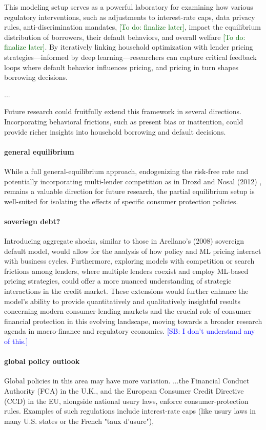 \documentclass[acmsmall]{acmart}
\newcommand{\todo}[1]{\textcolor{DarkGreen}{[To do: #1]}}
\newcommand{\spb}[1]{\textcolor{blue}{[SB: #1]}}
\begin{document}
This modeling setup serves as a powerful laboratory for examining how various regulatory interventions, such as adjustments to interest-rate caps, data privacy rules, anti-discrimination mandates, \todo{finalize later}, impact the equilibrium distribution of borrowers, their default behaviors, and overall welfare \todo{finalize later}. By iteratively linking household optimization with lender pricing strategies—informed by deep learning—researchers can capture critical feedback loops where default behavior influences pricing, and pricing in turn shapes borrowing decisions.


...

Future research could fruitfully extend this framework in several directions. Incorporating behavioral frictions, such as present bias or inattention, could provide richer insights into household borrowing and default decisions. 

\paragraph{general equilibrium}
While a full general-equilibrium approach, endogenizing the risk-free rate and potentially incorporating multi-lender competition as in Drozd and Nosal (2012) \cite{Drozd2012}, remains a valuable direction for future research, the partial equilibrium setup is well-suited for isolating the effects of specific consumer protection policies.


\paragraph{soveriegn debt?}
Introducing aggregate shocks, similar to those in Arellano’s (2008) sovereign default model, would allow for the analysis of how policy and ML pricing interact with business cycles. Furthermore, exploring models with competition or search frictions among lenders, where multiple lenders coexist and employ ML-based pricing strategies, could offer a more nuanced understanding of strategic interactions in the credit market.  These extensions would further enhance the model's ability to provide quantitatively and qualitatively insightful results concerning modern consumer-lending markets and the crucial role of consumer financial protection in this evolving landscape, moving towards a broader research agenda in macro-finance and regulatory economics. \spb{I don't understand any of this.}

\paragraph{global policy outlook} Global policies in this area may have more variation. 
...the Financial Conduct Authority (FCA) in the U.K., and the European Consumer Credit Directive (CCD) in the EU, alongside national usury laws, enforce consumer-protection rules. Examples of such regulations include interest-rate caps (like usury laws in many U.S. states or the French "taux d’usure"),
\end{document}
